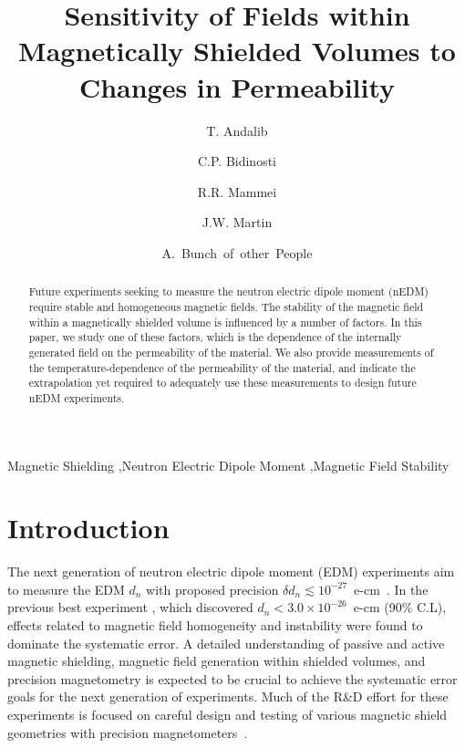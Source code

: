 \documentclass[review]{elsarticle}
\begin{document}
\begin{frontmatter}

\title{Sensitivity of Fields within Magnetically Shielded Volumes to
  Changes in Permeability}

\author[manitoba]{T. Andalib}
\author[winnipeg,manitoba]{C.P. Bidinosti}
\author[winnipeg,manitoba]{R.R. Mammei}
\author[winnipeg,manitoba]{J.W. Martin}
\author[winnipeg]{A.~Bunch~of~other~People}


\address[winnipeg]{Physics Department, The University of Winnipeg, 515 Portage Avenue, Winnipeg, MB, R3B 2E9, Canada}
\address[manitoba]{Department of Physics and Astronomy, University of Manitoba, Winnipeg, MB R3T 2N2, Canada}


\begin{abstract}
Future experiments seeking to measure the neutron electric dipole
moment (nEDM) require stable and homogeneous magnetic fields.  The
stability of the magnetic field within a magnetically shielded volume
is influenced by a number of factors.  In this paper, we study one of
these factors, which is the dependence of the internally generated
field on the permeability of the material.  We also provide
measurements of the temperature-dependence of the permeability of the
material, and indicate the extrapolation yet required to adequately
use these measurements to design future nEDM experiments.
\end{abstract}

\begin{keyword}
Magnetic Shielding \sep Neutron Electric Dipole Moment \sep Magnetic Field Stability
\end{keyword}

\end{frontmatter}

\linenumbers

\section{Introduction}


The next generation of neutron electric dipole moment (EDM)
experiments aim to measure the EDM $d_n$ with proposed precision
$\delta d_n\lesssim
10^{-27}$~e-cm~\cite{bib:nedm1,bib:nedm2,bib:nedm2.5,bib:nedm3,bib:nedm3.5,bib:nedm4,bib:nedm5,bib:nedm6,bib:nedm6.5}.
In the previous best experiment \cite{bib:pendlebury}, which
discovered $d_n<3.0\times 10^{-26}$~e-cm (90\% C.L), effects related
to magnetic field homogeneity and instability were found to dominate
the systematic error.  A detailed understanding of passive and active
magnetic shielding, magnetic field generation within shielded volumes,
and precision magnetometry is expected to be crucial to achieve the
systematic error goals for the next generation of experiments.  Much
of the R\&D effort for these experiments is focused on careful design
and testing of various magnetic shield geometries with precision
magnetometers~\cite{bib:brys,bib:afach,bib:fierlingerroom,bib:sturmthesis,bib:patton}.
\end{document}
